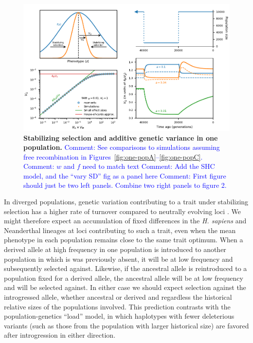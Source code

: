 \documentclass{article}
\newcommand{\aprcomment}[1]{{\textcolor{blue}{Comment: #1}}}
\begin{document}
\begin{figure}[tb!]
    \centering
    \includegraphics{../figures/one_pop.pdf}
    \caption{
        \textbf{Stabilizing selection and additive genetic variance in one population.}
        \aprcomment{See comparisons to simulations assuming free recombination in
        Figures~\ref{fig:one-popA}--\ref{fig:one-popC}.}
        \aprcomment{$w$ and $f$ need to match text}
        \aprcomment{Add the SHC model, and the ``vary SD'' fig as a panel here}
        \aprcomment{First figure should just be two left panels. Combine two
        right panels to figure 2.}
    }
    \label{fig:stab-sel}
\end{figure}

In diverged populations, genetic variation contributing to a trait under
stabilizing selection has a higher rate of turnover compared to neutrally
evolving loci \citep{yair2022population}. We might therefore expect an
accumulation of fixed differences in the \emph{H. sapiens} and Neanderthal
lineages at loci contributing to such a trait, even when the mean phenotype in
each population remains close to the same trait optimum. When a derived allele
at high frequency in one population is introduced to another population in
which is was previously absent, it will be at low frequency and subsequently
selected against. Likewise, if the ancestral allele is reintroduced to a
population fixed for a derived allele, the ancestral allele will be at low
frequency and will be selected against. In either case we should expect
selection against the introgressed allele, whether ancestral or derived and
regardless the historical relative sizes of the populations involved. This
prediction contrasts with the population-genetics ``load'' model, in which
haplotypes with fewer deleterious variants (such as those from the population
with larger historical size) are favored after introgression in either
direction.
\end{document}
